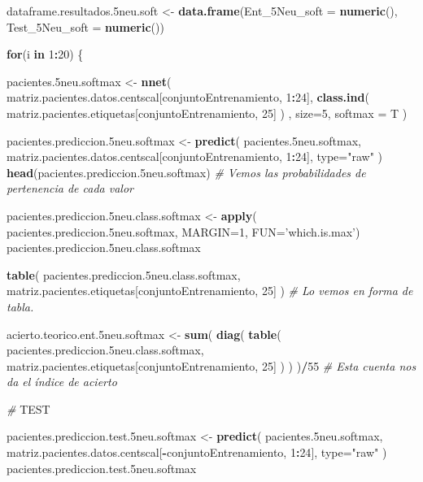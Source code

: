 \documentclass[]{article}
\newenvironment{Shaded}{\begin{snugshade}}{\end{snugshade}}
\newcommand{\KeywordTok}[1]{\textcolor[rgb]{0.13,0.29,0.53}{\textbf{#1}}}
\newcommand{\DataTypeTok}[1]{\textcolor[rgb]{0.13,0.29,0.53}{#1}}
\newcommand{\DecValTok}[1]{\textcolor[rgb]{0.00,0.00,0.81}{#1}}
\newcommand{\StringTok}[1]{\textcolor[rgb]{0.31,0.60,0.02}{#1}}
\newcommand{\CommentTok}[1]{\textcolor[rgb]{0.56,0.35,0.01}{\textit{#1}}}
\newcommand{\ControlFlowTok}[1]{\textcolor[rgb]{0.13,0.29,0.53}{\textbf{#1}}}
\newcommand{\OperatorTok}[1]{\textcolor[rgb]{0.81,0.36,0.00}{\textbf{#1}}}
\newcommand{\AlertTok}[1]{\textcolor[rgb]{0.94,0.16,0.16}{#1}}
\newcommand{\NormalTok}[1]{#1}
\begin{document}
\begin{Shaded}
\begin{Highlighting}[]
\NormalTok{dataframe.resultados.5neu.soft <-}\StringTok{ }\KeywordTok{data.frame}\NormalTok{(}\DataTypeTok{Ent_5Neu_soft =} \KeywordTok{numeric}\NormalTok{(),}
                                             \DataTypeTok{Test_5Neu_soft =} \KeywordTok{numeric}\NormalTok{())}

\ControlFlowTok{for}\NormalTok{(i }\ControlFlowTok{in} \DecValTok{1}\OperatorTok{:}\DecValTok{20}\NormalTok{)}
\NormalTok{\{}

\NormalTok{  pacientes.5neu.softmax <-}\StringTok{ }\KeywordTok{nnet}\NormalTok{( matriz.pacientes.datos.centscal[conjuntoEntrenamiento, }\DecValTok{1}\OperatorTok{:}\DecValTok{24}\NormalTok{], }\KeywordTok{class.ind}\NormalTok{( matriz.pacientes.etiquetas[conjuntoEntrenamiento, }\DecValTok{25}\NormalTok{] ) , }\DataTypeTok{size=}\DecValTok{5}\NormalTok{, }\DataTypeTok{softmax =}\NormalTok{ T )}
  
\NormalTok{  pacientes.prediccion.5neu.softmax <-}\StringTok{ }\KeywordTok{predict}\NormalTok{( pacientes.5neu.softmax, matriz.pacientes.datos.centscal[conjuntoEntrenamiento, }\DecValTok{1}\OperatorTok{:}\DecValTok{24}\NormalTok{], }\DataTypeTok{type=}\StringTok{"raw"}\NormalTok{ )}
  \KeywordTok{head}\NormalTok{(pacientes.prediccion.5neu.softmax) }\CommentTok{# Vemos las probabilidades de pertenencia de cada valor}
  
\NormalTok{  pacientes.prediccion.5neu.class.softmax <-}\StringTok{ }\KeywordTok{apply}\NormalTok{( pacientes.prediccion.5neu.softmax, }\DataTypeTok{MARGIN=}\DecValTok{1}\NormalTok{, }\DataTypeTok{FUN=}\StringTok{'which.is.max'}\NormalTok{)}
\NormalTok{  pacientes.prediccion.5neu.class.softmax}
  
  \KeywordTok{table}\NormalTok{( pacientes.prediccion.5neu.class.softmax, matriz.pacientes.etiquetas[conjuntoEntrenamiento, }\DecValTok{25}\NormalTok{] )  }\CommentTok{# Lo vemos en forma de tabla.}
  
\NormalTok{  acierto.teorico.ent.5neu.softmax <-}\StringTok{ }\KeywordTok{sum}\NormalTok{( }\KeywordTok{diag}\NormalTok{( }\KeywordTok{table}\NormalTok{( pacientes.prediccion.5neu.class.softmax, matriz.pacientes.etiquetas[conjuntoEntrenamiento, }\DecValTok{25}\NormalTok{] ) ) )}\OperatorTok{/}\DecValTok{55} \CommentTok{# Esta cuenta nos da el índice de acierto}
  
  \CommentTok{# }\AlertTok{TEST}
  
\NormalTok{  pacientes.prediccion.test.5neu.softmax <-}\StringTok{ }\KeywordTok{predict}\NormalTok{( pacientes.5neu.softmax, matriz.pacientes.datos.centscal[}\OperatorTok{-}\NormalTok{conjuntoEntrenamiento, }\DecValTok{1}\OperatorTok{:}\DecValTok{24}\NormalTok{], }\DataTypeTok{type=}\StringTok{"raw"}\NormalTok{ )}
\NormalTok{  pacientes.prediccion.test.5neu.softmax}
  

\end{Highlighting}
\end{Shaded}
\end{document}
